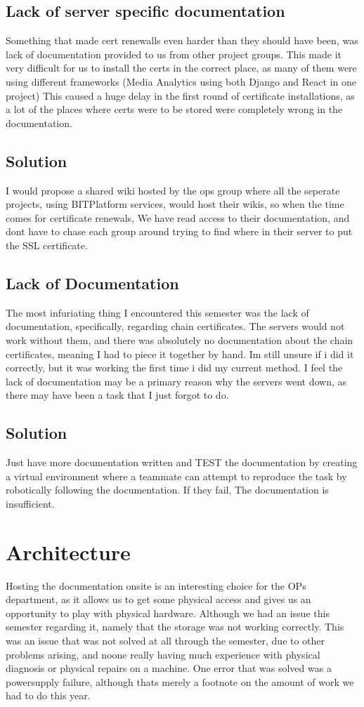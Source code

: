 \documentclass{article}
\begin{document}
\subsection{Lack of server specific documentation}
Something that made cert renewalls even harder than they should have been, was lack of documentation provided to us from other project groups. This made it very 
difficult for us to install the certs in the correct place, as many of them were using different frameworks (Media Analytics using both Django and React in one project) This caused a huge delay in the first round of certificate installations, as a lot of the places where certs were to be stored were completely wrong in the documentation. 
\subsection*{Solution}
I would propose a shared wiki hosted by the ops group where all the seperate projects, using BITPlatform services, would host their wikis, so when the time comes for certificate renewals, We have read access to their documentation, and dont have to chase each group around trying to find where in their server to put the SSL certificate.

\subsection{Lack of Documentation}
The most infuriating thing I encountered this semester was the lack of documentation, specifically, regarding chain certificates.
The servers would not work without them, and there was absolutely no documentation about the chain certificates, meaning I had to piece it together by hand.
Im still unsure if i did it correctly, but it was working the first time i did my current method. I feel the lack of documentation may be a primary reason
why the servers went down, as there may have been a task that I just forgot to do.

\subsection*{Solution}
Just have more documentation written and TEST the documentation by creating a virtual environment where a teammate can attempt to reproduce the task by robotically
following the documentation. If they fail, The documentation is insufficient. 

\section{Architecture}
Hosting the documentation onsite is an interesting choice for the OPs department, as it allows us to get some physical access and gives us an opportunity to play
with physical hardware. Although we had an issue this semester regarding it, namely that the storage was not working correctly. 
This was an issue that was not solved at all through the semester, due to other problems arising, and noone really having much experience with physical diagnosis 
or physical repairs on a machine. One error that was solved was a powersupply failure, although thats merely a footnote on the amount of work we had to do this year.
\end{document}
